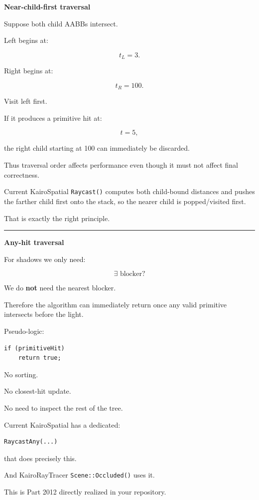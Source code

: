 \textbf{Near-child-first traversal}

Suppose both child AABBs intersect.

Left begins at:

\[
t_L=3.
\]

Right begins at:

\[
t_R=100.
\]

Visit left first.

If it produces a primitive hit at:

\[
t=5,
\]

the right child starting at 100 can immediately be discarded.

Thus traversal order affects performance even though it must not affect final correctness.

Current KairoSpatial \texttt{Raycast()} computes both child-bound distances and pushes the farther child first onto the stack, so the nearer child is popped/visited first.

That is exactly the right principle.

\begin{center}\rule{0.5\linewidth}{0.5pt}\end{center}

\textbf{Any-hit traversal}

For shadows we only need:

\[
\boxed{
\exists\text{ blocker?}
}
\]

We do \textbf{not} need the nearest blocker.

Therefore the algorithm can immediately return once any valid primitive intersects before the light.

Pseudo-logic:

\begin{verbatim}
if (primitiveHit)
    return true;
\end{verbatim}

No sorting.

No closest-hit update.

No need to inspect the rest of the tree.

Current KairoSpatial has a dedicated:

\begin{verbatim}
RaycastAny(...)
\end{verbatim}

that does precisely this.

And KairoRayTracer \texttt{Scene::Occluded()} uses it.

This is Part 2012 directly realized in your repository.

